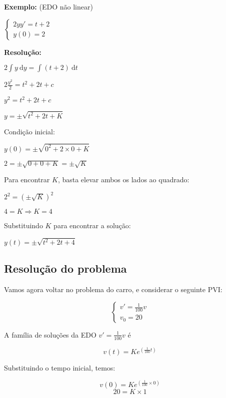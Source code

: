 \documentclass[a4paper]{article}
\newcommand{\ud}{\mathrm{\ d}}
\begin{document}
\hrulefill

\begin{multicols}{2}
{\bf Exemplo:} (EDO não linear)

$
\left\{
  \begin{array}{l}
    2yy'=t+2\\
    y(0)=2
  \end{array}
\right.
$

\bigskip
{\bf Resolução:}

$2\int y \ud y = \int (t+2) \ud t$

$2\frac{y^2}{2} = t^2 + 2t + c$

$y^2 = t^2 + 2t + c$

$y = \pm \sqrt{t^2 + 2t +K}$

Condição inicial:

$y(0)=\pm \sqrt{0^2 + 2\times 0 +K}$

$2 = \pm \sqrt{0 + 0 +K} = \pm \sqrt{K}$

Para encontrar $K$, basta elevar ambos os lados ao quadrado:

$2^2 = \left( \pm \sqrt{K} \right)^2$

$4 = K \Rightarrow K=4$

Substituindo $K$ para encontrar a solução:

$y(t) = \pm \sqrt{t^2 + 2t +4}$
\end{multicols}

\hrulefill

\subsection{Resolução do problema}

Vamos agora voltar no problema do carro, e considerar o seguinte PVI:

\begin{displaymath}
  \left\{
    \begin{array}{l}
      v'=\frac{1}{100}v\\
      v_0 = 20
    \end{array}
  \right.
\end{displaymath}

A família de soluções da EDO $v'=\frac{1}{100}v$ é

\begin{displaymath}
  v(t) = Ke^{(\frac{1}{100}t)}
\end{displaymath}

Substituindo o tempo inicial, temos:

\begin{displaymath}
  v(0) = Ke^{(\frac{1}{100}\times 0)}
\end{displaymath}
\begin{displaymath}
  20 = K \times 1
\end{displaymath}
\end{document}
